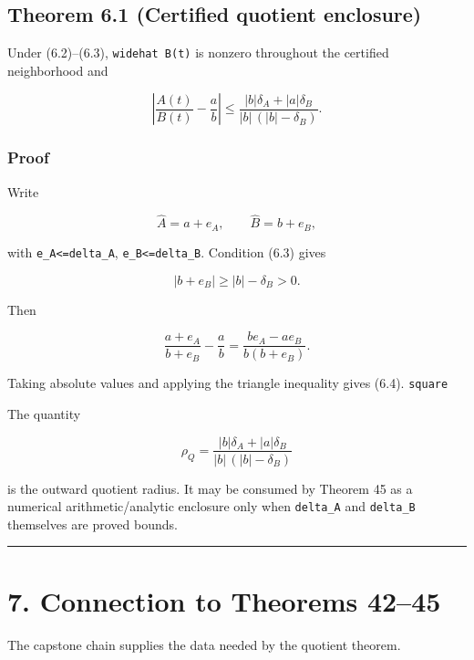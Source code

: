 \hypertarget{theorem-6.1-certified-quotient-enclosure}{%
\subsection{Theorem 6.1 (Certified quotient enclosure)}\label{theorem-6.1-certified-quotient-enclosure}}

Under (6.2)--(6.3), \texttt{widehat\ B(t)} is nonzero throughout the certified
neighborhood and

\[
\boxed{
\left|
\frac{A(t)}{B(t)}-\frac{a}{b}
\right|
\le
\frac{|b|\delta_A+|a|\delta_B}
{|b|\,(|b|-\delta_B)}.
}
\tag{6.4}
\]

\hypertarget{proof-2}{%
\subsubsection{Proof}\label{proof-2}}

Write

\[
\widehat A=a+e_A,
\qquad
\widehat B=b+e_B,
\]

with \texttt{\textbar{}e\_A\textbar{}\textless{}=delta\_A}, \texttt{\textbar{}e\_B\textbar{}\textless{}=delta\_B}. Condition (6.3) gives

\[
|b+e_B|\ge |b|-\delta_B>0.
\]

Then

\[
\frac{a+e_A}{b+e_B}-\frac ab
=\frac{b e_A-a e_B}{b(b+e_B)}.
\]

Taking absolute values and applying the triangle inequality gives (6.4).
\texttt{square}

The quantity

\[
\boxed{
\rho_Q=
\frac{|b|\delta_A+|a|\delta_B}
{|b|\,(|b|-\delta_B)}
}
\tag{6.5}
\]

is the outward quotient radius. It may be consumed by Theorem 45 as a numerical
arithmetic/analytic enclosure only when \texttt{delta\_A} and \texttt{delta\_B} themselves are
proved bounds.

\begin{center}\rule{0.5\linewidth}{0.5pt}\end{center}

\hypertarget{connection-to-theorems-4245}{%
\section{7. Connection to Theorems 42--45}\label{connection-to-theorems-4245}}

The capstone chain supplies the data needed by the quotient theorem.

